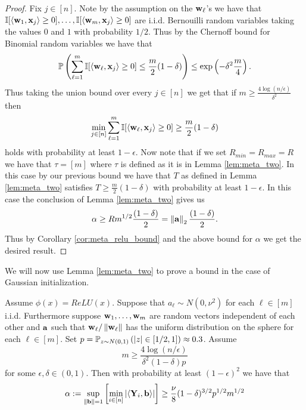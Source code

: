 \begin{proof}
Fix $j \in [n]$.  Note by the assumption on the $\mathbf{w}_\ell$'s we have that $\mathbb{I}[\langle \mathbf{w}_1, \mathbf{x}_j \rangle \geq 0], \ldots, \mathbb{I}[\langle \mathbf{w}_m, \mathbf{x}_j \rangle \geq 0]$ are i.i.d. Bernouilli random variables taking the values $0$ and $1$ with probability $1/2$.  Thus by the Chernoff bound for Binomial random variables we have that
\[ \mathbb{P} \left(\sum_{\ell = 1}^m \mathbb{I}[\langle \mathbf{w}_\ell, \mathbf{x}_j \rangle \geq 0] \leq  \frac{m}{2} (1 - \delta)\right) \leq \exp\left(- \delta^2 \frac{m}{4}\right). \]
Thus taking the union bound over every $j \in [n]$ we get that if $m \geq \frac{4 \log(n / \epsilon)}{\delta^2}$ then
\[ \min_{j \in [n]} \sum_{\ell = 1}^m \mathbb{I}[\langle \mathbf{w}_\ell, \mathbf{x}_j \rangle \geq 0] \geq \frac{m}{2}(1 - \delta) \]
holds with probability at least $1 - \epsilon$.  Now note that if we set $R_{min} = R_{max} = R$ we have that $\tau = [m]$ where $\tau$ is defined as it is in Lemma \ref{lem:meta_two}.  In this case by our previous bound we have that $T$ as defined in Lemma \ref{lem:meta_two} satisfies $T \geq \frac{m}{2}(1 - \delta)$ with probability at least $1 - \epsilon$.  In this case the conclusion of Lemma \ref{lem:meta_two} gives us
\[ \alpha \geq R m^{1/2} \frac{(1 - \delta)}{2} = \left\lVert\mathbf{a}\right\rVert_2 \frac{(1 - \delta)}{2}. \]
Thus by Corollary \ref{cor:meta_relu_bound} and the above bound for $\alpha$ we get the desired result.
\end{proof}
\par
We will now use Lemma \ref{lem:meta_two} to prove a bound in the case of Gaussian initialization.
\begin{lemma}\label{lem:gaussian_alpha_bound}
Assume $\phi(x) = ReLU(x)$.  Suppose that $a_\ell \sim N(0, \nu^2)$ for each $\ell \in [m]$ i.i.d.  Furthermore suppose $\mathbf{w}_1, \ldots, \mathbf{w}_m$ are random vectors independent of each other and $\mathbf{a}$ such that $\mathbf{w}_\ell / \left\lVert\mathbf{w}_\ell\right\rVert$ has the uniform distribution on the sphere for each $\ell \in [m]$.  Set $p = \mathbb{P}_{z \sim N(0, 1)}\left(|z| \in [1/2, 1]\right) \approx 0.3$.  Assume
\[ m \geq \frac{4 \log(n / \epsilon)}{\delta^2 (1 - \delta) p} \]
for some $\epsilon, \delta \in (0, 1)$.  Then with probability at least $(1 - \epsilon)^2$ we have that
\[\alpha := \sup_{\left\lVert\mathbf b\right\rVert = 1} \left[\min_{i \in [n]} |\langle \mathbf{Y}_i, \mathbf b \rangle| \right] \geq \frac{\nu}{8} (1 - \delta)^{3/2}p^{1/2} m^{1/2}   \]
\end{lemma}
